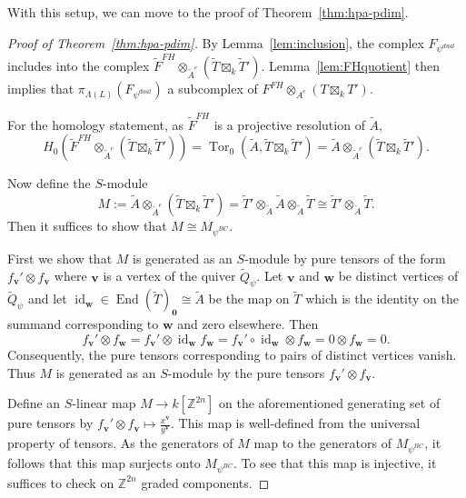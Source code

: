 \documentclass{amsart}
\newcommand{\ZZ}{\mathbb{Z}}
\newcommand{\field}{k}
\newcommand{\FFH}{F^{FH}}
\DeclareMathOperator{\End}{End}
\DeclareMathOperator{\Tor}{Tor}
\newcommand{\id}{\operatorname{id}}
\theoremstyle{remark}
\begin{document}
With this setup, we can move to the proof of Theorem~\ref{thm:hpa-pdim}.

\begin{proof}[Proof of Theorem~\ref{thm:hpa-pdim}]
  By Lemma~\ref{lem:inclusion}, the complex $F_{\psi^{dual}}$ includes into the complex $\widetilde{F}^{FH}\otimes_{\widetilde{A}^e} (\widetilde{T}\boxtimes_{\field} \widetilde{T}')$.
   Lemma~\ref{lem:FHquotient} then implies that $\pi_{\Lambda(L)}(F_{\psi^{dual}})$ a subcomplex of $\FFH\otimes_{A^e} (T\boxtimes_{\field} T')$.

  For the homology statement, as $\widetilde{F}^{FH}$ is a projective resolution of $\widetilde{A}$,
  \[H_0(\widetilde{F}^{FH}\otimes_{\widetilde{A}^e} (\widetilde{T}\boxtimes_{\field} \widetilde{T}')) = \Tor_0(\widetilde{A},\widetilde{T}\boxtimes_{\field} \widetilde{T}') = \widetilde{A}\otimes_{\widetilde{A}^e} (\widetilde{T}\boxtimes_{\field} \widetilde{T}').\]

  Now define the $S$-module
  \[M := \widetilde{A}\otimes_{\widetilde{A}^e} (\widetilde{T}\boxtimes_{\field} \widetilde{T}') = \widetilde{T}'\otimes_{\widetilde{A}} \widetilde{A} \otimes_{\widetilde{A}} \widetilde{T}\cong \widetilde{T}'\otimes_{\widetilde{A}} \widetilde{T}.\]
  Then it suffices to show that $M\cong M_{\psi^{BC}}$.

  First we show that $M$ is generated as an $S$-module by pure tensors of the form $f_{\bm{v}}'\otimes f_{\bm{v}}$ where $\bm{v}$ is a vertex of the quiver $\widetilde{Q}_\psi$.
  Let $\bm{v}$ and $\bm{w}$ be distinct vertices of $\widetilde{Q}_\psi$ and let $\id_{\bm{w}}\in \End(\widetilde{T})_{\bm{0}}\cong \widetilde{A}$
  be the map on $\widetilde{T}$ which is the identity on the summand corresponding to $\bm{w}$ and zero elsewhere. Then
  \[f_{\bm{v}}'\otimes f_{\bm{w}}=f_{\bm{v}}'\otimes \id_{\bm{w}} f_{\bm{w}} = f_{\bm{v}}'\circ \id_{\bm{w}} \otimes f_{\bm{w}} = 0\otimes f_{\bm{w}} = 0.\]
  Consequently, the pure tensors corresponding to pairs of distinct vertices vanish. Thus $M$ is generated as an $S$-module by the pure tensors $f_{\bm{v}}'\otimes f_{\bm{v}}$.

  Define an $S$-linear map $M\rightarrow \field[\ZZ^{2n}]$ on the aforementioned generating set of pure tensors by $f_{\bm{v}}'\otimes f_{\bm{v}} \mapsto \frac{x^{\bm{v}}}{y^{\bm{v}}}$.
  This map is well-defined from the universal property of tensors. As the generators of $M$ map to the generators of $M_{\psi^{BC}}$,
  it follows that this map surjects onto $M_{\psi^{BC}}$. To see that this map is injective, it suffices to check on $\ZZ^{2n}$ graded components.


\end{proof}
\end{document}
